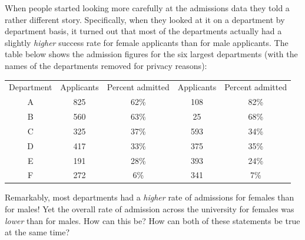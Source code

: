 \documentclass[]{book}
\begin{document}
When people started looking more carefully at the admissions data \citep{Bickel1975} they told a rather different story. Specifically, when they looked at it on a department by department basis, it turned out that most of the departments actually had a slightly \emph{higher} success rate for female applicants than for male applicants. The table below shows the admission figures for the six largest departments (with the names of the departments removed for privacy reasons):

\begin{longtable}[]{@{}ccccc@{}}
\toprule
\endhead
Department & Applicants & Percent admitted & Applicants & Percent admitted\tabularnewline
A & 825 & 62\% & 108 & 82\%\tabularnewline
B & 560 & 63\% & 25 & 68\%\tabularnewline
C & 325 & 37\% & 593 & 34\%\tabularnewline
D & 417 & 33\% & 375 & 35\%\tabularnewline
E & 191 & 28\% & 393 & 24\%\tabularnewline
F & 272 & 6\% & 341 & 7\%\tabularnewline
\bottomrule
\end{longtable}

Remarkably, most departments had a \emph{higher} rate of admissions for females than for males! Yet the overall rate of admission across the university for females was \emph{lower} than for males. How can this be? How can both of these statements be true at the same time?
\end{document}
